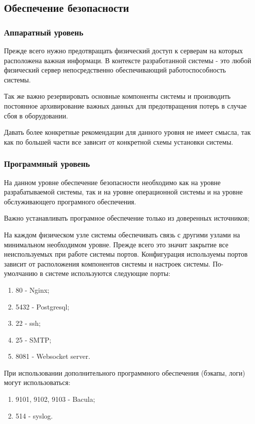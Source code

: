 \subsection{Обеспечение безопасности}
\subsubsection{Аппаратный уровень}
Прежде всего нужно предотвращать физический доступ к серверам на которых
расположена важная информаци. В контексте разработанной системы - это любой
физический сервер непосредственно обеспечивающий работоспособность системы.

Так же важно резервировать основные компоненты системы и производить постоянное
архивирование важных данных для предотвращения потерь в случае сбоя в
оборудовании.

Давать более конкретные рекомендации для данного уровня не имеет смысла, так как
по большей части все зависит от конкретной схемы установки системы.

\subsubsection{Программный уровень}
На данном уровне обеспечение безопасности необходимо как на уровне
разрабатываемой системы, так и на уровне операционной системы и на уровне
обслуживающего програмного обеспечения.

Важно устанавливать програмное обеспечение только из доверенных источников;

На каждом физическом узле системы обеспечивать связь с другими узлами на
минимальном необходимом уровне. Прежде всего это значит закрытие все
неиспользуемых при работе системы портов. Конфигурация используемы портов
зависит от расположения компонентов системы и настроек системы. По-умолчанию в
системе используются следующие порты:
\begin{enumerate}
  \item 80 - Nginx;
  \item 5432 - Postgresql;
  \item 22 - ssh;
  \item 25 - SMTP;
  \item 8081 - Websocket server.   
\end{enumerate}

При использовании дополнительного программного обеспечения (бэкапы, логи) могут
использоваться:
\begin{enumerate}
  \item 9101, 9102, 9103 - Bacula;
  \item 514 - syslog.   
\end{enumerate}

